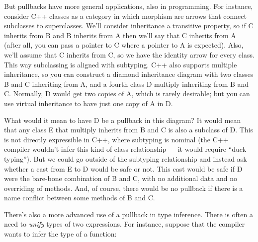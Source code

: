 But pullbacks have more general applications, also in programming. For
instance, consider C++ classes as a category in which morphism are
arrows that connect subclasses to superclasses. We'll consider
inheritance a transitive property, so if C inherits from B and B
inherits from A then we'll say that C inherits from A (after all, you
can pass a pointer to C where a pointer to A is expected). Also, we'll
assume that C inherits from C, so we have the identity arrow for every
class. This way subclassing is aligned with subtyping. C++ also supports
multiple inheritance, so you can construct a diamond inheritance diagram
with two classes B and C inheriting from A, and a fourth class D
multiply inheriting from B and C. Normally, D would get two copies of A,
which is rarely desirable; but you can use virtual inheritance to have
just one copy of A in D.

What would it mean to have D be a pullback in this diagram? It would
mean that any class E that multiply inherits from B and C is also a
subclass of D. This is not directly expressible in C++, where subtyping
is nominal (the C++ compiler wouldn't infer this kind of class
relationship --- it would require ``duck typing''). But we could go
outside of the subtyping relationship and instead ask whether a cast
from E to D would be safe or not. This cast would be safe if D were the
bare-bone combination of B and C, with no additional data and no
overriding of methods. And, of course, there would be no pullback if
there is a name conflict between some methods of B and C.

\begin{figure}[H]
\centering
{}
\end{figure}

\noindent
There's also a more advanced use of a pullback in type inference. There
is often a need to \emph{unify} types of two expressions. For instance,
suppose that the compiler wants to infer the type of a function:

